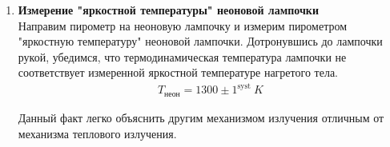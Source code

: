 \begin{enumerate}
\item
\textbf{Измерение "яркостной температуры" неоновой лампочки}\\

Направим пирометр на неоновую лампочку и измерим пирометром "яркостную температуру" неоновой лампочки. Дотронувшись до лампочки рукой, убедимся, что термодинамическая температура лампочки не соответствует измеренной яркостной температуре нагретого тела.
\begin{gather*}
T_{\text{неон}} = 1300 \pm 1^{\text{syst}}~K
\end{gather*}

Данный факт легко объяснить другим механизмом излучения отличным от механизма теплового излучения.

\end{enumerate}


